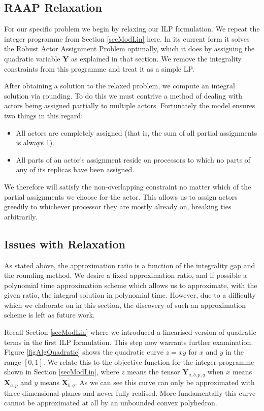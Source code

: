 \subsection{RAAP Relaxation}

For our specific problem we begin by relaxing our ILP formulation.
We repeat the integer programme from Section \ref{secModLin} here.
In its current form it solves the Robust Actor Assignment Problem optimally, which it does by assigning the quadratic variable $\mathbf{Y}$ as explained in that section.
We remove the integrality constraints from this programme and treat it as a simple LP.



After obtaining a solution to the relaxed problem, we compute an integral solution via rounding.
To do this we must contrive a method of dealing with actors being assigned partially to multiple actors.
Fortunately the model ensures two things in this regard:
\begin{itemize}
	\item All actors are completely assigned (that is, the sum of all partial assignments is always 1).
	\item All parts of an actor's assignment reside on processors to which no parts of any of its replicas have been assigned.
\end{itemize}
\noindent We therefore will satisfy the non-overlapping constraint no matter which of the partial assignments we choose for the actor.
This allows us to assign actors greedily to whichever processor they are mostly already on, breaking ties arbitrarily.

\subsection{Issues with Relaxation}

As stated above, the approximation ratio is a function of the integrality gap and the rounding method.
We desire a fixed approximation ratio, and if possible a polynomial time approximation scheme which allows us to approximate, with the given ratio, the integral solution in polynomial time.
However, due to a difficulty which we elaborate on in this section, the discovery of such an approximation scheme is left as future work.

Recall Section \ref{secModLin} where we introduced a linearised version of quadratic terms in the first ILP formulation.
This step now warrants further examination.
Figure \ref{figAlgQuadratic} shows the quadratic curve $z=xy$ for $x$ and $y$ in the range $[0,1]$.
We relate this to the objective function for the integer programme shown in Section \ref{secModLin}, where $z$ means the tensor $\mathbf{Y}_{a,b,p,q}$ when $x$ means $\mathbf{X}_{a,p}$ and $y$ means $\mathbf{X}_{b,q}$. 
As we can see this curve can only be approximated with three dimensional planes and never fully realised.
More fundamentally this curve cannot be approximated at all by an unbounded convex polyhedron.

